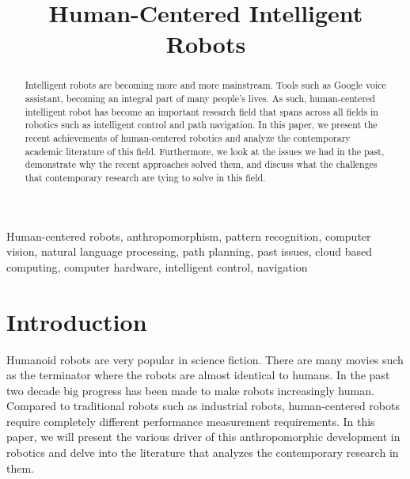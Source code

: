 \documentclass[conference]{IEEEtran}
\begin{document}
\title{Human-Centered Intelligent Robots\\
}

\author{
\and
{}
}

\maketitle

\begin{abstract}
Intelligent robots are becoming more and more mainstream. Tools such as Google voice assistant, becoming an integral part of many people's lives. As such, human-centered intelligent robot has become an important research field that spans across all fields in robotics such as intelligent control and path navigation. In this paper, we present the recent achievements of human-centered robotics and analyze the contemporary academic literature of this field. Furthermore, we look at the issues we had in the past, demonstrate why the recent approaches solved them, and discuss what the challenges that contemporary research are tying to solve in this field.
\end{abstract}

\begin{IEEEkeywords}
Human-centered robots, anthropomorphism, pattern recognition, computer vision, natural language processing, path planning, past issues, cloud based computing, computer hardware, intelligent control, navigation
\end{IEEEkeywords}

\section{Introduction}
Humanoid robots are very popular in science fiction. There are many movies such as the terminator where the robots are almost identical to humans. In the past two decade big progress has been made to make robots increasingly human. Compared to traditional robots such as industrial robots, human-centered robots require completely different performance measurement requirements\autocite{zinn2004new}. In this paper, we will present the various driver of this anthropomorphic development in robotics and delve into the literature that analyzes the contemporary research in them.
\end{document}

